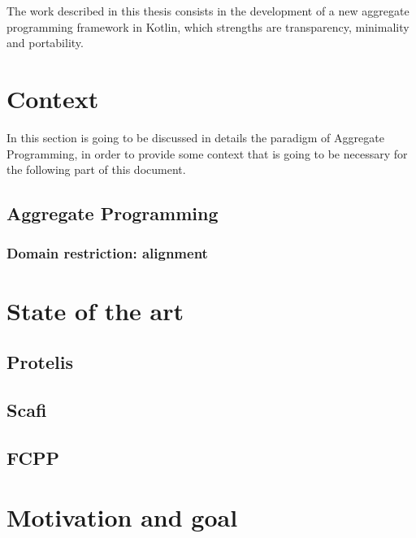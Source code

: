 The work described in this thesis consists in the development of a new aggregate programming framework in Kotlin, which strengths are transparency, minimality and portability. 

\section{Context}
In this section is going to be discussed in details the paradigm of Aggregate Programming, in order to provide some context that is going to be necessary for the following part of this document.

\subsection{Aggregate Programming}


\subsubsection{Domain restriction: alignment}

\section{State of the art}
\subsection{Protelis}
\subsection{Scafi}
\subsection{FCPP}

\section{Motivation and goal}